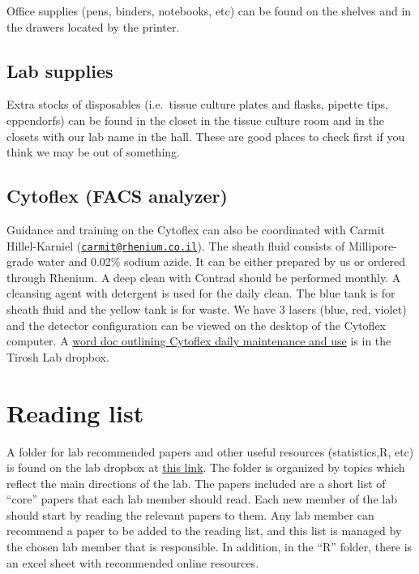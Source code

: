 \documentclass[]{book}
\begin{document}
Office supplies (pens, binders, notebooks, etc) can be found on the
shelves and in the drawers located by the printer.

\section{Lab supplies}\label{lab-supplies}

Extra stocks of disposables (i.e.~tissue culture plates and flasks,
pipette tips, eppendorfs) can be found in the closet in the tissue
culture room and in the closets with our lab name in the hall. These are
good places to check first if you think we may be out of something.

\section{Cytoflex (FACS analyzer)}\label{cytoflex-facs-analyzer}

Guidance and training on the Cytoflex can also be coordinated with
Carmit Hillel-Karniel
(\href{mailto:carmit@rhenium.co.il}{\nolinkurl{carmit@rhenium.co.il}}).
The sheath fluid consists of Millipore-grade water and 0.02\% sodium
azide. It can be either prepared by us or ordered through Rhenium. A
deep clean with Contrad should be performed monthly. A cleansing agent
with detergent is used for the daily clean. The blue tank is for sheath
fluid and the yellow tank is for waste. We have 3 lasers (blue, red,
violet) and the detector configuration can be viewed on the desktop of
the Cytoflex computer. A
\href{https://www.dropbox.com/s/ckvy0vshi45e95r/LSR\%20II\%20Quick\%20Reference.docx?dl=0}{word
doc outlining Cytoflex daily maintenance and use} is in the Tirosh Lab
dropbox.

\chapter{Reading list}\label{readingList}

A folder for lab recommended papers and other useful resources
(statistics,R, etc) is found on the lab dropbox at
\href{https://www.dropbox.com/sh/52ybes4a40ypn0q/AAAL2FlVKqRJw-Z4ScuWTW7Ra?dl=0}{this
link}. The folder is organized by topics which reflect the main
directions of the lab. The papers included are a short list of ``core''
papers that each lab member should read. Each new member of the lab
should start by reading the relevant papers to them. Any lab member can
recommend a paper to be added to the reading list, and this list is
managed by the chosen lab member that is responsible. In addition, in
the ``R'' folder, there is an excel sheet with recommended online
resources.
\end{document}
